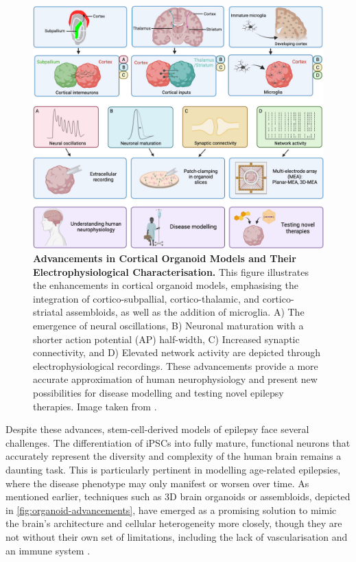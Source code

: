 \documentclass[10pt]{article}
\begin{document}
\begin{sloppypar}
  \begin{figure}[!ht]
    \centering
    \includegraphics[width=\textwidth]{figures/organoid-advancements.jpg}
    \caption[Advancements in Cortical Organoid Models]{\textbf{Advancements in Cortical Organoid Models and Their Electrophysiological Characterisation.} This figure illustrates the enhancements in cortical organoid models, emphasising the integration of cortico-subpallial, cortico-thalamic, and cortico-striatal assembloids, as well as the addition of microglia. A) The emergence of neural oscillations, B) Neuronal maturation with a shorter action potential (AP) half-width, C) Increased synaptic connectivity, and D) Elevated network activity are depicted through electrophysiological recordings. These advancements provide a more accurate approximation of human neurophysiology and present new possibilities for disease modelling and testing novel epilepsy therapies. Image taken from \cite{zourray_electrophysiological_2022}.}
    \label{fig:organoid-advancements}
  \end{figure}

  Despite these advances, stem-cell-derived models of epilepsy face several challenges. The differentiation of iPSCs into fully mature, functional neurons that accurately represent the diversity and complexity of the human brain remains a daunting task. This is particularly pertinent in modelling age-related epilepsies, where the disease phenotype may only manifest or worsen over time. As mentioned earlier, techniques such as 3D brain organoids or assembloids, depicted in \autoref{fig:organoid-advancements}, have emerged as a promising solution to mimic the brain’s architecture and cellular heterogeneity more closely, though they are not without their own set of limitations, including the lack of vascularisation and an immune system \citep{lancaster_cerebral_2013, di_lullo_use_2017}.


\end{sloppypar}
\end{document}
